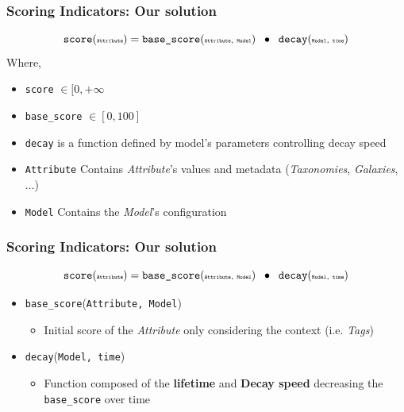 \begin{frame}
    \frametitle{Scoring Indicators: Our solution}
    $$ \texttt{score}(\texttt{\tiny Attribute}) = \texttt{base\_score}(\texttt{\tiny Attribute, Model}) \;\;\bullet\;\; \texttt{decay}(\texttt{\tiny Model, time}) $$
    Where,\vspace{0.5cm}
    \begin{itemize}
        \item \texttt{score} $ \in [0, +\infty $
        \item \texttt{base\_score} $ \in [0, 100] $
        \item \texttt{decay} is a function defined by model's parameters controlling decay speed
        \item \texttt{Attribute} Contains \textit{Attribute}'s values and metadata {\scriptsize (\textit{Taxonomies}, \textit{Galaxies}, ...)}
        \item \texttt{Model} Contains the \textit{Model}'s configuration
    \end{itemize}
    
\end{frame}

\begin{frame}
    \frametitle{Scoring Indicators: Our solution}
    $$ \texttt{score}(\texttt{\tiny Attribute}) = \texttt{base\_score}(\texttt{\tiny Attribute, Model}) \;\;\bullet\;\; \texttt{decay}(\texttt{\tiny Model, time}) $$
    \begin{itemize}
        \item \texttt{base\_score}(\texttt{\tiny Attribute, Model})
            \begin{itemize}
                \item Initial score of the \textit{Attribute} only considering the context (i.e. \textit{Tags})
            \end{itemize}
        \vspace{1cm}
        \item \texttt{decay}(\texttt{\tiny Model, time})
            \begin{itemize}
                \item Function composed of the \textbf{lifetime} and \textbf{Decay speed} decreasing the \texttt{base\_score} over time
            \end{itemize}
    \end{itemize}
\end{frame}

